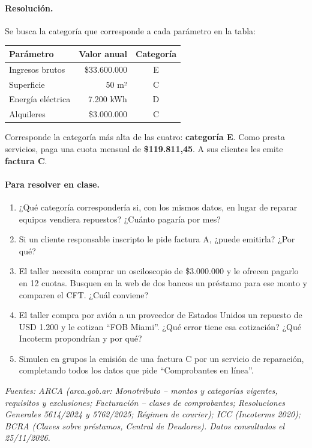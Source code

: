 \paragraph*{Resolución.} Se busca la categoría que corresponde a cada parámetro en la tabla:
\begin{center}
\small
\begin{tabular}{|l|r|c|}
\hline
\textbf{Parámetro} & \textbf{Valor anual} & \textbf{Categoría} \\ \hline
Ingresos brutos & \$33.600.000 & E \\ \hline
Superficie & 50 m² & C \\ \hline
Energía eléctrica & 7.200 kWh & D \\ \hline
Alquileres & \$3.000.000 & C \\ \hline
\end{tabular}
\end{center}
Corresponde la categoría más alta de las cuatro: \textbf{categoría E}. Como presta servicios,
paga una cuota mensual de \textbf{\$119.811,45}. A sus clientes les emite \textbf{factura C}.

\paragraph*{Para resolver en clase.}
\begin{enumerate}
  \item ¿Qué categoría correspondería si, con los mismos datos, en lugar de reparar equipos
        vendiera repuestos? ¿Cuánto pagaría por mes?
  \item Si un cliente responsable inscripto le pide factura A, ¿puede emitirla? ¿Por qué?
  \item El taller necesita comprar un osciloscopio de \$3.000.000 y le ofrecen pagarlo en
        12 cuotas. Busquen en la web de dos bancos un préstamo para ese monto y comparen el
        CFT. ¿Cuál conviene?
  \item El taller compra por avión a un proveedor de Estados Unidos un repuesto de USD 1.200 y le
        cotizan ``FOB Miami''. ¿Qué error tiene esa cotización? ¿Qué Incoterm propondrían y por qué?
  \item Simulen en grupos la emisión de una factura C por un servicio de reparación,
        completando todos los datos que pide ``Comprobantes en línea''.
\end{enumerate}

\vspace{6pt}
{\footnotesize\textit{Fuentes: ARCA (arca.gob.ar: Monotributo – montos y categorías vigentes,
requisitos y exclusiones; Facturación – clases de comprobantes; Resoluciones Generales
5614/2024 y 5762/2025; Régimen de courier); ICC (Incoterms 2020); BCRA (Claves sobre préstamos, Central de Deudores). Datos consultados
el 25/11/2026.}}
